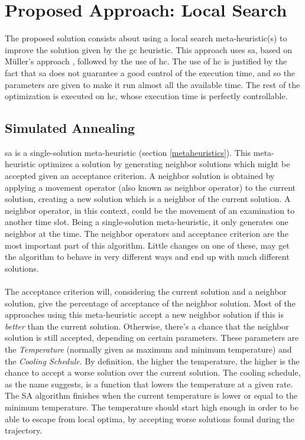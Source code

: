 \chapter{Proposed Approach: Local Search}
\label{sec:LocalSearch}
\thispagestyle{plain}

The proposed solution consists about using a local search meta-heuristic(s) to improve the solution given by the \gls{gc} heuristic. This approach uses \gls{sa}, based on M\"{u}ller's approach \cite{Mueller2009}, followed by the use of \gls{hc}. The use of \gls{hc} is justified by the fact that \gls{sa} does not guarantee a good control of the execution time, and so the parameters are given to make it run almost all the available time. The rest of the optimization is executed on \gls{hc}, whose execution time is perfectly controllable.

\section{Simulated Annealing}
\label{sec:SimulatedAnnealing}

\gls{sa} is a single-solution meta-heuristic (section \ref{metaheuristics}). This meta-heuristic optimizes a solution by generating neighbor solutions which might be accepted given an acceptance criterion. A neighbor solution is obtained by applying a movement operator (also known as neighbor operator) to the current solution, creating a new solution which is a neighbor of the current solution. A neighbor operator, in this context, could be the movement of an examination to another time slot. Being a single-solution meta-heuristic, it only generates one neighbor at the time. The neighbor operators and acceptance criterion are the most important part of this algorithm. Little changes on one of these, may get the algorithm to behave in very different ways and end up with much different solutions.\\
\\
The acceptance criterion will, considering the current solution and a neighbor solution, give the percentage of acceptance of the neighbor solution. Most of the approaches using this meta-heuristic accept a new neighbor solution if this is \textit{better} than the current solution. Otherwise, there's a chance that the neighbor solution is still accepted, depending on certain parameters. These parameters are the \textit{Temperature} (normally given as maximum and minimum temperature) and the \textit{Cooling Schedule}. By definition, the higher the temperature, the higher is the chance to accept a worse solution over the current solution. The cooling schedule, as the name suggests, is a function that lowers the temperature at a given rate. The SA algorithm finishes when the current temperature is lower or equal to the minimum temperature. The temperature should start high enough in order to be able to escape from local optima, by accepting worse solutions found during the trajectory.

